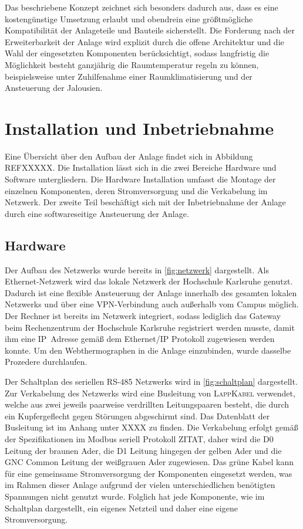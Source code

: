 Das beschriebene Konzept zeichnet sich besonders dadurch aus, dass es eine kostengünstige Umsetzung erlaubt und obendrein eine größtmögliche Kompatibilität der Anlageteile und Bauteile sicherstellt. Die Forderung nach der Erweiterbarkeit der Anlage wird explizit durch die offene Architektur und die Wahl der eingesetzten Komponenten berücksichtigt, sodass langfristig die Möglichkeit besteht ganzjährig die Raumtemperatur regeln zu können, beispielsweise unter Zuhilfenahme einer Raumklimatisierung und der Ansteuerung der Jalousien.

\section{Installation und Inbetriebnahme}

Eine Übersicht über den Aufbau der Anlage findet sich in Abbildung REFXXXXX. Die Installation lässt sich in die zwei Bereiche Hardware und Software untergliedern. Die Hardware Installation umfasst die  Montage der einzelnen Komponenten, deren Stromversorgung und die Verkabelung im Netzwerk.
Der zweite Teil beschäftigt sich mit der Inbetriebnahme der Anlage durch eine softwareseitige Ansteuerung der Anlage.


\subsection{Hardware}

Der Aufbau des Netzwerks wurde bereits in \ref{fig:netzwerk} dargestellt. Als Ethernet-Netzwerk wird das lokale Netzwerk der Hochschule Karlsruhe genutzt. Dadurch ist eine flexible Ansteuerung der Anlage innerhalb des gesamten lokalen Netzwerks und über eine VPN-Verbindung auch außerhalb vom Campus möglich. Der Rechner ist bereits im Netzwerk integriert, sodass lediglich das Gateway beim Rechenzentrum der Hochschule Karlsruhe registriert werden musste, damit ihm eine IP~Adresse gemäß dem Ethernet/IP Protokoll zugewiesen werden konnte.
Um den Webthermographen in die Anlage einzubinden, wurde dasselbe Prozedere durchlaufen.

Der Schaltplan des seriellen RS-485 Netzwerks wird in \ref{fig:schaltplan} dargestellt. Zur Verkabelung des Netzwerks wird eine Busleitung von \textsc{LappKabel} verwendet, welche aus zwei jeweils paarweise verdrillten Leitungspaaren
besteht, die durch ein Kupfergeflecht gegen Störungen abgeschirmt sind. Das Datenblatt der Busleitung ist im Anhang unter XXXX zu finden.
Die Verkabelung erfolgt gemäß der Spezifikationen im Modbus seriell Protokoll ZITAT, daher wird die D0 Leitung der braunen Ader, die D1 Leitung hingegen der gelben Ader und die GNC Common Leitung der weißgrauen Ader zugewiesen. Das grüne Kabel kann für eine gemeinsame Stromversorgung der Komponenten eingesetzt werden, was im Rahmen dieser Anlage aufgrund der vielen unterschiedlichen benötigten Spannungen nicht genutzt wurde. Folglich hat jede Komponente, wie im Schaltplan dargestellt, ein eigenes Netzteil und daher eine eigene Stromversorgung. 

